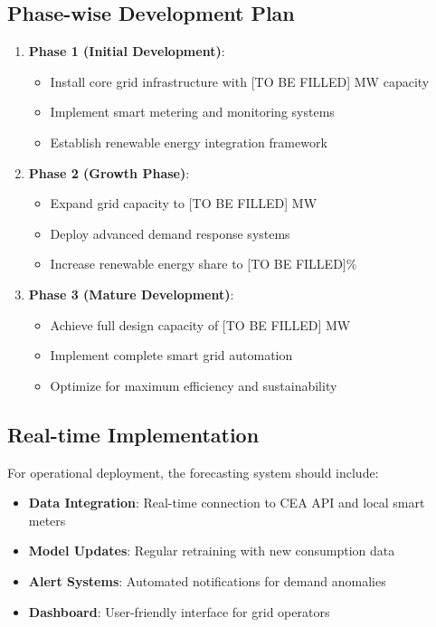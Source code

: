 \documentclass[12pt,a4paper]{article}
\begin{document}
\subsection{Phase-wise Development Plan}
\begin{enumerate}
    \item \textbf{Phase 1 (Initial Development)}: 
    \begin{itemize}
        \item Install core grid infrastructure with [TO BE FILLED] MW capacity
        \item Implement smart metering and monitoring systems
        \item Establish renewable energy integration framework
    \end{itemize}
    
    \item \textbf{Phase 2 (Growth Phase)}:
    \begin{itemize}
        \item Expand grid capacity to [TO BE FILLED] MW
        \item Deploy advanced demand response systems
        \item Increase renewable energy share to [TO BE FILLED]\%
    \end{itemize}
    
    \item \textbf{Phase 3 (Mature Development)}:
    \begin{itemize}
        \item Achieve full design capacity of [TO BE FILLED] MW
        \item Implement complete smart grid automation
        \item Optimize for maximum efficiency and sustainability
    \end{itemize}
\end{enumerate}

\subsection{Real-time Implementation}
For operational deployment, the forecasting system should include:

\begin{itemize}
    \item \textbf{Data Integration}: Real-time connection to CEA API and local smart meters
    \item \textbf{Model Updates}: Regular retraining with new consumption data
    \item \textbf{Alert Systems}: Automated notifications for demand anomalies
    \item \textbf{Dashboard}: User-friendly interface for grid operators
\end{itemize}
\end{document}
